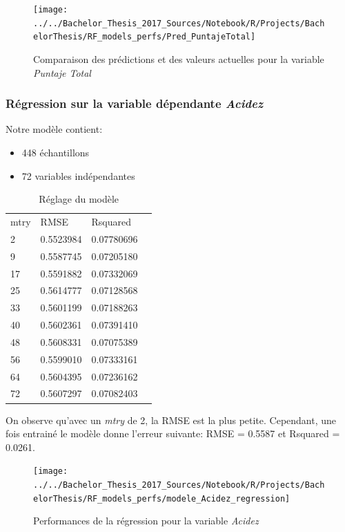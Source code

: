 \begin{figure}[H]
	\centering
	\texttt{[image: ../../Bachelor\_Thesis\_2017\_Sources/Notebook/R/Projects/BachelorThesis/RF\_models\_perfs/Pred\_PuntajeTotal]}
	\caption{Comparaison des prédictions et des valeurs actuelles pour la variable \textit{Puntaje Total}}
	\label{fig:predpuntajetotal}
\end{figure}





\newpage
\subsubsection{Régression sur la variable dépendante \textit{Acidez}}
\noindent Notre modèle contient: 
\begin{itemize}
	\item 448 échantillons
	\item 72 variables indépendantes
\end{itemize}


\begin{table}[H]
	\centering
	\caption{Réglage du modèle}
	\label{RF_Acidez_Resampling}
	\begin{tabular}{llll}
	    mtry & RMSE      & Rsquared   \\
	    2    & 0.5523984 & 0.07780696 \\
	    9    & 0.5587745 & 0.07205180 \\
	    17   & 0.5591882 & 0.07332069 \\
	    25   & 0.5614777 & 0.07128568 \\
	    33   & 0.5601199 & 0.07188263 \\
	    40   & 0.5602361 & 0.07391410 \\
	    48   & 0.5608331 & 0.07075389 \\
	    56   & 0.5599010 & 0.07333161 \\
	    64   & 0.5604395 & 0.07236162 \\
	    72   & 0.5607297 & 0.07082403
	\end{tabular}
\end{table}

\noindent On observe qu'avec un \textit{mtry} de 2, la RMSE est la plus petite. Cependant, une fois entrainé le modèle donne l'erreur suivante: RMSE = 0.5587  et Rsquared = 0.0261. 

\begin{figure}[H]
	\centering
	\texttt{[image: ../../Bachelor\_Thesis\_2017\_Sources/Notebook/R/Projects/BachelorThesis/RF\_models\_perfs/modele\_Acidez\_regression]}
	\caption{Performances de la régression pour la variable \textit{Acidez}}
	\label{fig:modeleacidezregression}
\end{figure}


